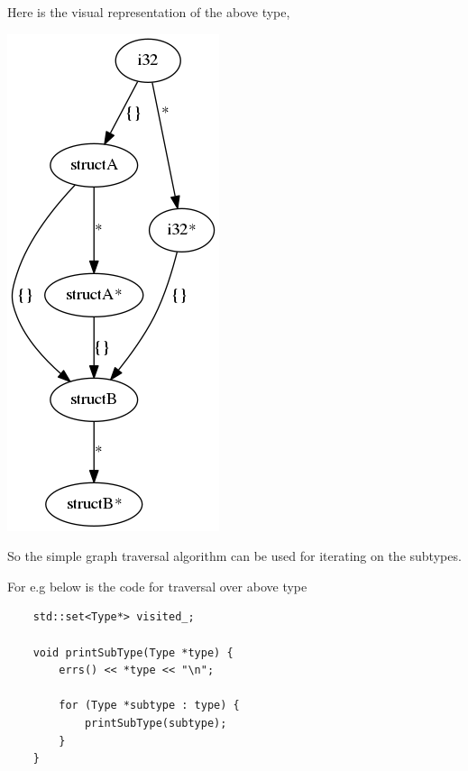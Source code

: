 \documentclass[a4paper,12pt]{report}
\begin{document}
Here is the visual representation of the above type,

\begin{center}
\includegraphics[scale=0.5]{output}
\end{center}

\noindent
So the simple graph traversal algorithm can be used for iterating on the
subtypes.

\noindent
For e.g below is the code for traversal over above type

\begin{verbatim}
    std::set<Type*> visited_;

    void printSubType(Type *type) {
        errs() << *type << "\n";

        for (Type *subtype : type) {
            printSubType(subtype);
        }
    }

\end{verbatim}



\end{document}
